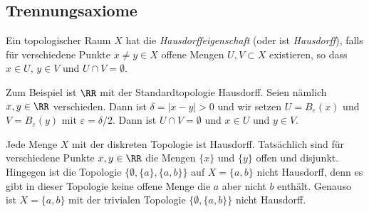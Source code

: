 \subsection{Trennungsaxiome}

\begin{definition}
Ein topologischer Raum $X$ hat die \emph{Hausdorffeigenschaft} (oder ist \emph{Hausdorff}), falls für verschiedene Punkte $x\neq y\in X$ offene Mengen $U,V\subset X$ existieren, so dass $x\in U$, $y\in V$ und $U\cap V = \emptyset$.
\end{definition}

Zum Beispiel ist $\RR$ mit der Standardtopologie Hausdorff. Seien nämlich $x,y\in\RR$ verschieden. Dann ist $\delta = |x-y| > 0$ und wir setzen $U = B_\varepsilon(x)$ und $V= B_\varepsilon(y)$ mit $\varepsilon = \delta/2$. Dann ist $U\cap V = \emptyset$ und $x\in U$ und $y\in V$.

Jede Menge $X$ mit der diskreten Topologie ist Hausdorff. Tatsächlich sind für verschiedene Punkte $x,y\in\RR$ die Mengen $\{x\}$ und $\{y\}$ offen und disjunkt. Hingegen ist die Topologie $\{\emptyset, \{a\}, \{a,b\}\}$ auf $X = \{a,b\}$ nicht Hausdorff, denn es gibt in dieser Topologie keine offene Menge die $a$ aber nicht $b$ enthält. Genauso ist $X = \{a,b\}$ mit der trivialen Topologie $\{\emptyset,\{a,b\}\}$ nicht Hausdorff.

